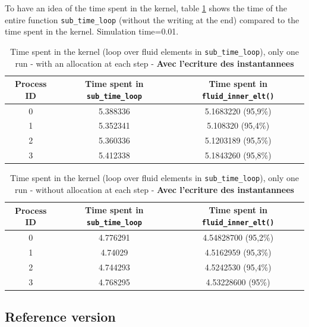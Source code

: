 \documentclass[10pt,twoside]{article}   	%
\begin{document}
To have an idea of the time spent in the kernel, table \ref{tab:7} shows the time of the entire function \texttt{sub\_time\_loop} (without the writing at the end) compared to the time spent in the kernel. Simulation time=0.01.

\begin{table}[H]
\centering
\caption{Time spent in the kernel (loop over fluid elements in {\tt sub\_time\_loop}), only one run - with an allocation at each step - {\bf{Avec l'ecriture des instantannees}}}
{\small
\begin{tabular}{|c|c|c|} \hline 
 {{\bf{Process ID}}} 	& {{\bf{Time spent in \texttt{sub\_time\_loop} }}}	& {{\bf{Time spent in \texttt{fluid\_inner\_elt()} }}}\\ \hline \hline
		0		&   5.388336							&  5.1683220	(95,9\%)		\\ \hline 
 		1		&  5.352341							&  5.108320	(95,4\%)		\\ \hline
 		2		 &  5.360336							&  5.1203189	(95,5\%)		\\ \hline
		3		 &  5.412338 							&  5.1843260	(95,8\%)		\\ \hline	
\end{tabular}
}
\label{tab:7}
\end{table}

\begin{table}[H]
\centering
\caption{Time spent in the kernel (loop over fluid elements in {\tt sub\_time\_loop}), only one run - without allocation at each step - {\bf{Avec l'ecriture des instantannees}}}
{\small
\begin{tabular}{|c|c|c|} \hline 
 {{\bf{Process ID}}} 	& {{\bf{Time spent in \texttt{sub\_time\_loop} }}}	& {{\bf{Time spent in \texttt{fluid\_inner\_elt()} }}}\\ \hline \hline
		0		&   4.776291							&  4.54828700	(95,2\%)		\\ \hline 
 		1		&  4.74029							&  4.5162959	(95,3\%)		\\ \hline
 		2		 &  4.744293							&  4.5242530	(95,4\%)		\\ \hline
		3		 & 4.768295 							&  4.53228600	(95\%)		\\ \hline	
\end{tabular}
}
\label{tab:8}
\end{table}


\subsection{Reference version}
\end{document}

